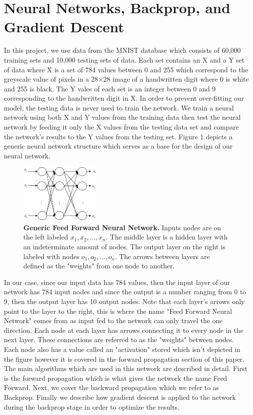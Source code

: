 \documentclass[12pt]{article}
\theoremstyle{definition}
\theoremstyle{plain}
\begin{document}
\section{Neural Networks, Backprop, and Gradient Descent}
In this project, we use data from the MNIST database which consists of 60,000 training sets and 10,000 testing sets of data. Each set contains an X and a Y set of data where X is a set of 784 values between 0 and 255 which correspond to the greyscale value of pixels in a 28$\times$28 image of a handwritten digit where 0 is white and 255 is black. The Y vales of each set is an integer between 0 and 9 corresponding to the handwritten digit in X. In order to prevent over-fitting our model, the testing data is never used to train the network. We train a neural network using both X and Y values from the training data then test the neural network by feeding it only the X values from the testing data set and compare the network's results to the Y values from the testing set. Figure 1 depicts a generic neural network structure which serves as a base for the design of our neural network.
\begin{figure}
	\centering
	\includegraphics[width=0.35\textwidth]{Images/FFNN.jpg}
	\caption{\textbf{Generic Feed Forward Neural Network.} Inputs nodes are on the left labeled $x_1,x_2,...,x_n$. The middle layer is a hidden layer with an indeterminate amount of nodes. The output layer on the right is labeled with nodes $o_1,o_2,...,o_n$. The arrows between layers are defined as the "weights" from one node to another.}
\end{figure}
In our case, since our input data has 784 values, then the input layer of our network has 784 input nodes and since the output is a number ranging from 0 to 9, then the output layer has 10 output nodes. Note that each layer's arrows only point to the layer to the right, this is where the name "Feed Forward Neural Network" comes from as input fed to the network can only travel the one direction. Each node at each layer has arrows connecting it to every node in the next layer. These connections are referred to as the "weights" between nodes. Each node also has a value called an "activation" stored which isn't depicted in the figure however it is covered in the forward propagation section of this paper. The main algorithms which are used in this network are described in detail. First is the forward propagation which is what gives the network the name Feed Forward. Next, we cover the backward propagation which we refer to as Backprop. Finally we describe how gradient descent is applied to the network during the backprop stage in order to optimize the results.
\end{document}
